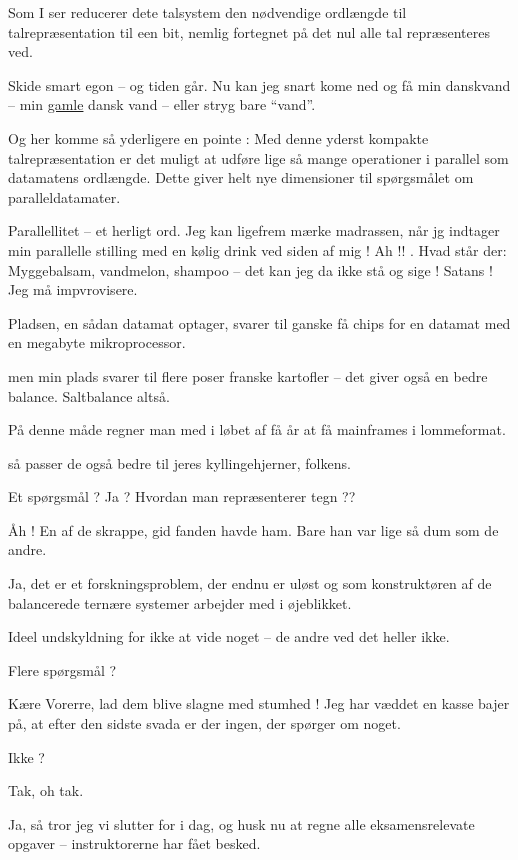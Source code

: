 \documentclass[a4paper,11pt]{article}
\begin{document}
\begin{sketch}
 Som I ser reducerer dete talsystem den nødvendige ordlængde til
talrepræsentation til een bit, nemlig fortegnet på det nul alle tal
repræsenteres ved.

 Skide smart egon -- og tiden går. Nu kan jeg snart kome ned og få min
danskvand -- min \underline{gamle} dansk vand -- eller stryg bare ``vand''.

 Og her komme så yderligere en pointe : Med denne yderst kompakte
talrepræsentation er det muligt at udføre lige så mange operationer i parallel
som datamatens ordlængde.  Dette giver helt nye dimensioner til spørgsmålet om
paralleldatamater.

 Parallellitet -- et herligt ord. Jeg kan ligefrem mærke madrassen, når
jg indtager min parallelle stilling med en kølig drink ved siden af mig !  Ah !!
.  Hvad står der: Myggebalsam,
vandmelon, shampoo -- det kan jeg da ikke stå og sige ! Satans ! Jeg må
impvrovisere.

 Pladsen, en sådan datamat optager, svarer til ganske få chips for en
datamat med en megabyte mikroprocessor.

 men min plads svarer til flere poser franske kartofler -- det giver
også en bedre balance. Saltbalance altså.

 På denne måde regner man med i løbet af få år at få mainframes i
lommeformat.

 så passer de også bedre til jeres kyllingehjerner, folkens.

 Et spørgsmål ? Ja ? Hvordan man repræsenterer tegn ??

 Åh ! En af de skrappe, gid fanden havde ham. Bare han var lige så dum
som de andre.

 Ja, det er et forskningsproblem, der endnu er uløst og som
konstruktøren af de balancerede ternære systemer arbejder med i øjeblikket.

 Ideel undskyldning for ikke at vide noget -- de andre ved det heller
ikke.

 Flere spørgsmål ?

 Kære Vorerre, lad dem blive slagne med stumhed !  Jeg har væddet en
kasse bajer på, at efter den sidste svada er der ingen, der spørger om noget.

 Ikke ?

 Tak, oh tak.

 Ja, så tror jeg vi slutter for i dag, og husk nu at regne alle
eksamensrelevate opgaver -- instruktorerne har fået besked.


\end{sketch}
\end{document}
